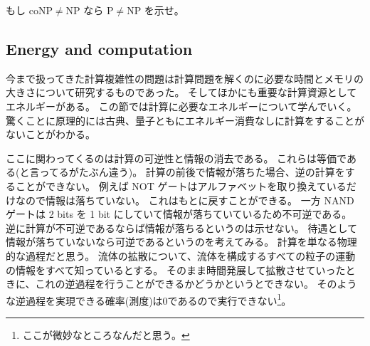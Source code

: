 \documentclass[../../master.tex]{subfiles}
\begin{document}
\begin{tcolorbox}[title = Excercise 3.18]
    もし coNP\(\neq\)NP なら P\(\neq\)NP を示せ。
\end{tcolorbox}

\clearpage
\setcounter{subsection}{4}
\subsection{Energy and computation}
今まで扱ってきた計算複雑性の問題は計算問題を解くのに必要な時間とメモリの大きさについて研究するものであった。
そしてほかにも重要な計算資源としてエネルギーがある。
この節では計算に必要なエネルギーについて学んでいく。
驚くことに原理的には古典、量子ともにエネルギー消費なしに計算をすることがないことがわかる。

ここに関わってくるのは計算の可逆性と情報の消去である。
これらは等価である(と言ってるがたぶん違う)。
計算の前後で情報が落ちた場合、逆の計算をすることができない。
例えば
NOT ゲートはアルファベットを取り換えているだけなので情報は落ちていない。
これはもとに戻すことができる。
一方 NAND ゲートは 2 bits を 1 bit にしていて情報が落ちていているため不可逆である。
逆に計算が不可逆であるならば情報が落ちるというのは示せない。
待遇として情報が落ちていないなら可逆であるというのを考えてみる。
計算を単なる物理的な過程だと思う。
流体の拡散について、流体を構成するすべての粒子の運動の情報をすべて知っているとする。
そのまま時間発展して拡散させていったときに、これの逆過程を行うことができるかどうかというとできない。
そのような逆過程を実現できる確率(測度)は0であるので実行できない\footnote{ここが微妙なところなんだと思う。}。
\end{document}
